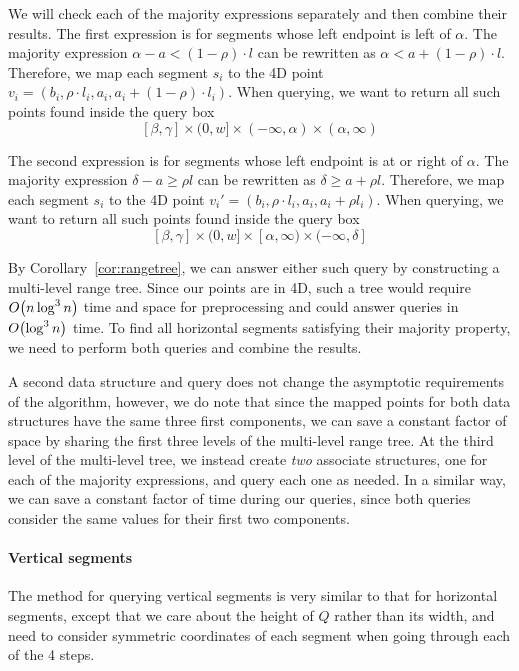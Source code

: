 We will check each of the majority expressions separately and then combine their results. The first expression is for segments whose left endpoint is left of $\alpha$. The majority expression $\alpha - a < (1 - \rho) \cdot l$ can be rewritten as $\alpha < a + (1-\rho) \cdot l$. Therefore, we map each segment $s_i$ to the 4D point $v_i = (b_i, \rho \cdot l_i, a_i, a_i + (1-\rho) \cdot l_i)$.  When querying, we want to return all such points found inside the query box
\[
[\beta, \gamma] \times (0, w] \times (-\infty, \alpha) \times (\alpha, \infty)
\]

The second expression is for segments whose left endpoint is at or right of $\alpha$. The majority expression $\delta - a \geq \rho l$ can be rewritten as $\delta \geq a + \rho l$. Therefore, we map each segment $s_i$ to the 4D point $v_i' = (b_i, \rho \cdot l_i, a_i, a_i + \rho l_i)$.  When querying, we want to return all such points found inside the query box
\[
[\beta, \gamma] \times (0, w] \times [\alpha, \infty) \times (-\infty, \delta]
\]

By Corollary~\ref{cor:rangetree}, we can answer either such query by constructing a multi-level range tree.  Since our points are in 4D, such a tree would require $O\!\left(n \log^3{n}\right)$ time and space for preprocessing and could answer queries in $O\!\left(\log^3{n}\right)$ time.  To find all horizontal segments satisfying their majority property, we need to perform both queries and combine the results.  

A second data structure and query does not change the asymptotic requirements of the algorithm, however, we do note that since the mapped points for both data structures have the same three first components, we can save a constant factor of space by sharing the first three levels of the multi-level range tree. At the third level of the multi-level tree, we instead create \emph{two} associate structures, one for each of the majority expressions, and query each one as needed. In a similar way, we can save a constant factor of time during our queries, since both queries consider the same values for their first two components.


\paragraph{Vertical segments}

The method for querying vertical segments is very similar to that for horizontal segments, except that we care about the height of $Q$ rather than its width, and need to consider symmetric coordinates of each segment when going through each of the 4 steps.


